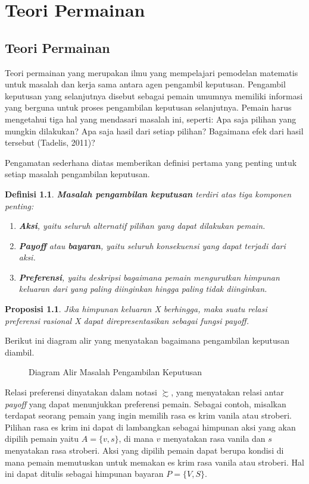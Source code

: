 \newtheorem{definisi}{Definisi}
\newtheorem{proposisi}{Proposisi}
\newtheorem{aksioma}{Aksioma}
\chapter{Teori Permainan}
\section{Teori Permainan}
Teori permainan yang merupakan ilmu yang mempelajari pemodelan matematis untuk masalah dan kerja sama antara agen pengambil keputusan. Pengambil keputusan yang selanjutnya disebut sebagai pemain umumnya memiliki informasi yang berguna untuk proses pengambilan keputusan selanjutnya. Pemain harus mengetahui tiga hal yang mendasari masalah ini, seperti: Apa saja pilihan yang mungkin dilakukan? Apa saja hasil dari setiap pilihan? Bagaimana efek dari hasil tersebut (Tadelis, 2011)?

Pengamatan sederhana diatas memberikan definisi pertama yang penting untuk setiap masalah pengambilan keputusan.
\begin{definisi}
    \textbf{Masalah pengambilan keputusan} terdiri atas tiga komponen penting:
    \begin{enumerate}
        \item \textbf{Aksi}, yaitu seluruh alternatif pilihan yang dapat dilakukan pemain.
        \item \textbf{Payoff} atau \textbf{bayaran}, yaitu seluruh konsekuensi yang dapat terjadi dari aksi.
        \item \textbf{Preferensi}, yaitu deskripsi bagaimana pemain mengurutkan himpunan keluaran dari yang paling diinginkan hingga paling tidak diinginkan.
    \end{enumerate}
\end{definisi}

\begin{proposisi}
    Jika himpunan keluaran X berhingga, maka suatu relasi preferensi rasional X dapat direpresentasikan sebagai fungsi payoff.
\end{proposisi}

Berikut ini diagram alir yang menyatakan bagaimana pengambilan keputusan diambil.
\pagebreak
\begin{figure}
    \centering
    
    \caption{Diagram Alir Masalah Pengambilan Keputusan}
\end{figure}

Relasi preferensi dinyatakan dalam notasi $\succsim$, yang menyatakan relasi antar \textit{payoff} yang dapat menunjukkan preferensi pemain. Sebagai contoh, misalkan terdapat seorang pemain yang ingin memilih rasa es krim vanila atau stroberi. Pilihan rasa es krim ini dapat di lambangkan sebagai himpunan aksi yang akan dipilih pemain yaitu  $A = \lbrace v, s\rbrace$, di mana $v$ menyatakan rasa vanila dan $s$ menyatakan rasa stroberi. Aksi yang dipilih pemain dapat berupa kondisi di mana pemain memutuskan untuk memakan es krim rasa vanila atau stroberi. Hal ini dapat ditulis sebagai himpunan bayaran $P = \lbrace V, S\rbrace$.

